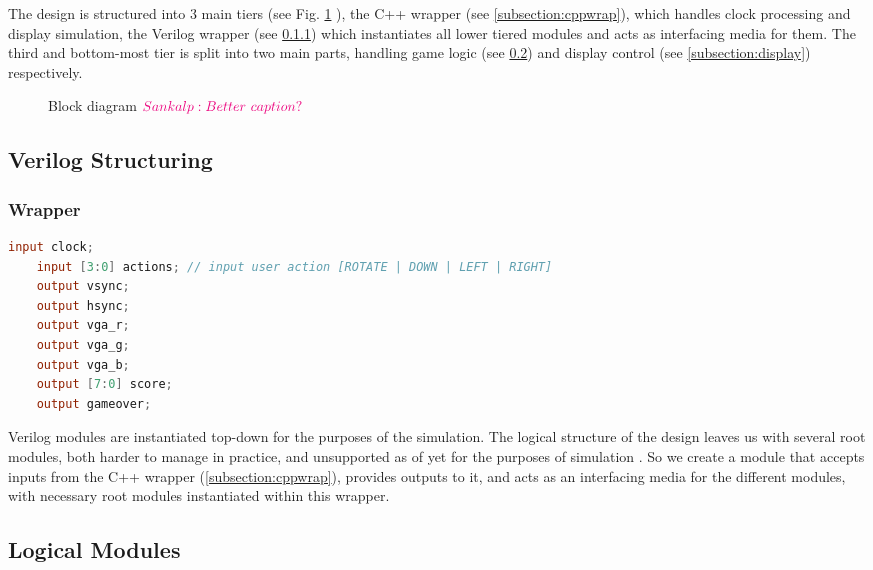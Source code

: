 The design is structured into 3 main tiers (see Fig. \ref{fig:blockdiag} ),
the C++ wrapper (see \ref{subsection:cppwrap}), which handles clock
processing and display simulation, the Verilog wrapper (see \ref{subsection:wrapper})
which instantiates all lower tiered modules and acts as interfacing
media for them. The third and bottom-most tier is split into two 
main parts, handling game logic (see \ref{subsection:logicalmod}) and
display control (see \ref{subsection:display}) respectively.

\begin{figure}[ht]
    \centering
    
    \caption{Block diagram $\sankalp{Better\ caption?}$}
\label{fig:blockdiag}
\end{figure}

\subsection{Verilog Structuring}

\subsubsection{Wrapper}
\label{subsection:wrapper}
%
\begin{lstlisting}[language=Verilog]
    input clock;
    input [3:0] actions; // input user action [ROTATE | DOWN | LEFT | RIGHT]
    output vsync;
    output hsync;
    output vga_r;
    output vga_g;
    output vga_b;
    output [7:0] score;
    output gameover;
\end{lstlisting}

Verilog modules are instantiated top-down for the purposes of the 
simulation. The logical structure of the design leaves us with 
several root modules, both harder to manage in practice, and 
unsupported as of yet for the purposes of simulation \cite{verilatortopmod}.
So we create a module that accepts inputs from the C++ wrapper (\ref{subsection:cppwrap}),
provides outputs to it, and acts as an interfacing media for the different
modules, with necessary root modules instantiated within this wrapper.\\

\subsection{Logical Modules}
\label{subsection:logicalmod}
